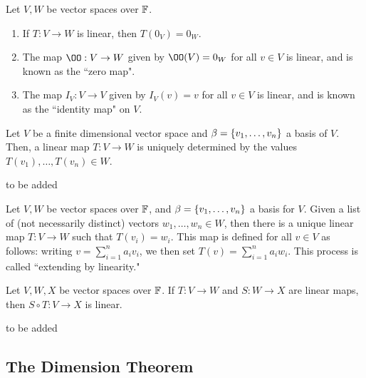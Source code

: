\documentclass{article}
\begin{document}
\begin{thm}
Let $ V, W $ be vector spaces over $ \mathbb{F} $.
\begin{enumerate}
    \item If $ T: V \rightarrow W $ is linear, then $ T(0_{V}) = 0_{W} $.
    \item The map $ \OO : V \rightarrow W $ given by $ \OO(V) = 0_{W} $ for all $ v \in V $ is linear, and is known as the ``zero map".
    \item The map $ I_{V} : V \rightarrow V $ given by $ I_{V}(v) = v $ for all $ v \in V $ is linear, and is known as the ``identity map" on $ V $.
\end{enumerate}
\end{thm}

\begin{thm}
Let $ V $ be a finite dimensional vector space and $ \beta = \left\{{v_{1}, \dots, v_{n}}\right\} $ a basis of $ V $.
Then, a linear map $ T:V \rightarrow W $ is uniquely determined by the values $ T(v_{1}), \dots, T(v_{n}) \in W $.
\end{thm}

\begin{pf}[source=Primary Source Material]
to be added
\end{pf}

\begin{crll}
Let $ V, W $ be vector spaces over $ \mathbb{F} $, and $ \beta = \left\{{v_{1}, \dots, v_{n}}\right\} $ a basis for $ V $.
Given a list of (not necessarily distinct) vectors $ w_{1}, \dots, w_{n} \in W $, then there is a unique linear map $ T:V \rightarrow W $ such that $ T(v_{i}) = w_{i} $. \vsp
This map is defined for all $ v \in V $ as follows: writing $ v = \displaystyle\sum_{i=1}^{n} {a_{i}v_{i}}  $, we then set $ T(v) = \displaystyle\sum_{i=1}^{n} {a_{i}w_{i}} $. \vsp
This process is called ``extending by linearity."
\end{crll}

\begin{thm}
Let $ V, W, X $ be vector spaces over $ \mathbb{F} $. If $ T:V \rightarrow W $ and $ S : W \rightarrow X $ are linear maps, then $ S \circ T : V \rightarrow X $ is linear.
\end{thm}

\begin{pf}[]
to be added
\end{pf}

\subsection{The Dimension Theorem}
\end{document}
